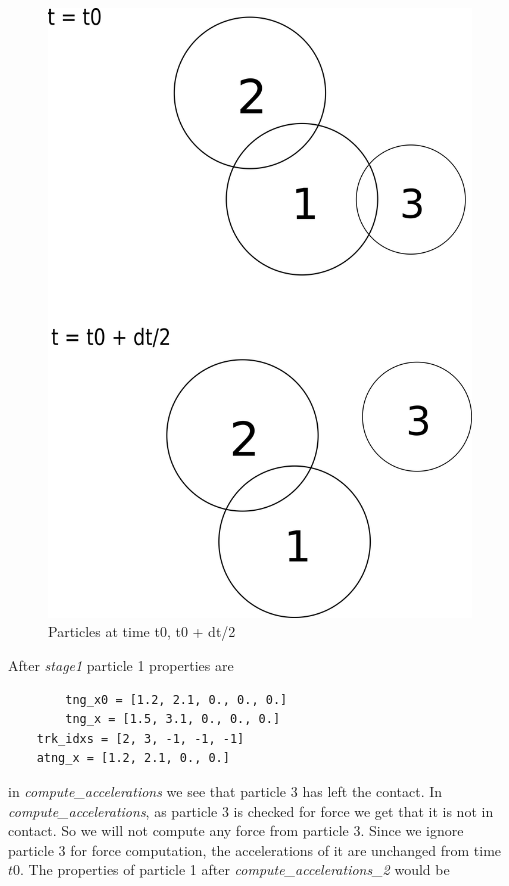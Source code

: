 \documentclass[11pt]{article}
\begin{document}
\begin{figure}[H]
\centering
\includegraphics[scale=0.25]{dem_physics_figures/case2.png}
\caption{Particles at time t0, t0 + dt/2\label{fig:case2}}
\end{figure}

After \emph{stage1} particle 1 properties are

\begin{verbatim}
        tng_x0 = [1.2, 2.1, 0., 0., 0.]
        tng_x = [1.5, 3.1, 0., 0., 0.]
	trk_idxs = [2, 3, -1, -1, -1]
	atng_x = [1.2, 2.1, 0., 0.]
\end{verbatim}

in \emph{compute\_accelerations} we see that particle 3 has left
the contact. In \emph{compute\_accelerations}, as particle 3 is checked for force
we get that it is not in contact. So we will not compute any force from
particle 3. Since we ignore particle 3 for force computation, the accelerations
of it are unchanged from time \(t0\). The properties of particle 1 after \emph{compute\_accelerations\_2}
would be
\end{document}
